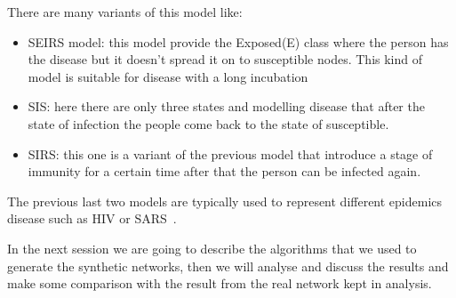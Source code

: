     There are many variants of this model like:
    \begin{itemize}
      \item SEIRS model: this model provide the Exposed(E) class where the person has the disease but it doesn't spread it on to susceptible nodes.
      This kind of model is suitable for disease with a long incubation 
      \item SIS: here there are only three states and modelling disease that after the state of infection the people come back to the state of susceptible.
      \item SIRS: this one is a variant of the previous model that introduce a stage of immunity for a certain time after that the person can be infected again.
    \end{itemize}
    The previous last two models are typically used to represent different epidemics disease such as HIV or SARS~\cite{hethcote2000mathematics}.
    
    In the next session we are going to describe the algorithms that we used to generate the synthetic networks, then we will analyse and discuss the results and make some comparison with the result from the real network kept in analysis. 
